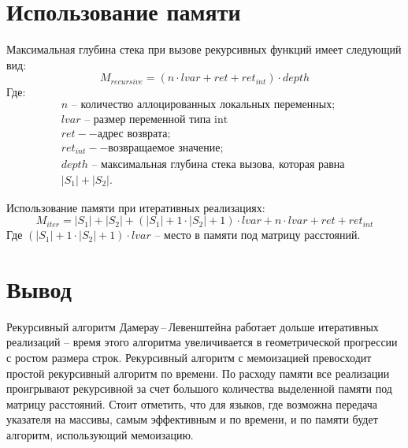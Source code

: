 \section{Использование памяти}

Максимальная глубина стека при вызове рекурсивных функций имеет следующий вид:
\begin{equation}\label{rec-mem}
	M_{recursive} = (n \cdot lvar + ret + ret_{int}) \cdot depth
\end{equation}
Где:
\[
\begin{array}{l}
	n\text{ -- количество аллоцированных локальных переменных}; \\
	lvar\text{ -- размер переменной типа int} \\
	ret -- \text{адрес возврата;}\\
	ret_{int} -- \text{возвращаемое значение;}\\
	depth\text{ --  максимальная глубина стека вызова, которая равна } \\
	|S_1| + |S_2|.
\end{array}
\]

Использование памяти при итеративных реализациях: 
\begin{equation}
	M_{iter} = |S_1| + |S_2| + (|S_1| + 1 \cdot |S_2| + 1) \cdot lvar + n \cdot lvar + ret + ret_{int}
\end{equation}
Где $(|S_1| + 1 \cdot |S_2| + 1) \cdot lvar$ -- место в памяти под матрицу расстояний.

\section{Вывод}
Рекурсивный алгоритм  Дамерау\,--\,Левенштейна работает дольше итеративных реализаций -- время этого алгоритма увеличивается в геометрической прогрессии с ростом размера строк.
Рекурсивный алгоритм с мемоизацией превосходит простой рекурсивный алгоритм по времени. 
По расходу памяти все реализации проигрывают рекурсивной за счет большого количества выделенной памяти под матрицу расстояний.
Стоит отметить, что для языков, где возможна передача указателя на массивы, самым эффективным и по времени, и по памяти будет алгоритм, использующий мемоизацию.